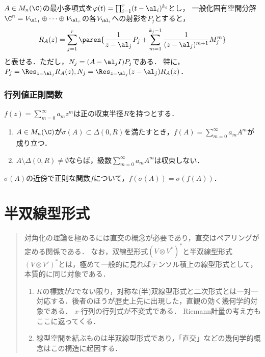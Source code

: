 \documentclass[uplatex, dvipdfmx]{jsreport}
\begin{document}
\begin{theorem}
    $A\in M_n(\C)$の最小多項式を$\varphi(t)=\prod_{i=1}^r(t-\al_i)^{k_i}$とし，
    一般化固有空間分解$\C^n=V_{\al_1}\oplus\cdots\oplus V_{\al_r}$の各$V_{\al_i}$への射影を$P_j$とすると，
    \[R_A(z)=\sum_{j=1}^r\paren{\frac{1}{z-\al_j}P_j+\sum_{m=1}^{k_j-1}\frac{1}{(z-\al_j)^{m+1}}M_j^m}\]
    と表せる．ただし，$N_j=(A-\al_j I)P_j$である．
    特に，$P_j=\Res_{z=\al_j}R_A(z),N_j=\Res_{z=\al_j}(z-\al_j)R_A(z)$．
\end{theorem}

\subsection{行列値正則関数}

\begin{theorem}
    $f(z)=\sum_{m=0}^\infty a_mz^m$は正の収束半径$R$を持つとする．
    \begin{enumerate}
        \item $A\in M_n(\C)$が$\sigma(A)\subset\Delta(0,R)$を満たすとき，$f(A)=\sum_{m=0}^\infty a_mA^m$が成り立つ．
        \item $A\setminus\Delta(0,R)\ne\emptyset$ならば，級数$\sum_{m=0}^\infty a_mA^m$は収束しない．
    \end{enumerate}
\end{theorem}

\begin{theorem}[スペクトル写像定理]
    $\sigma(A)$の近傍で正則な関数$f$について，$f(\sigma(A))=\sigma(f(A))$．
\end{theorem}

\chapter{半双線型形式}

\begin{quotation}
    対角化の理論を極めるには直交の概念が必要であり，直交はペアリングが定める関係である．
    なお，双線型形式$(V\otimes V^*)^*$と半双線型形式$(V\otimes V')^*$とは，極めて一般的に見ればテンソル積上の線型形式として，本質的に同じ対象である．
    \begin{enumerate}
        \item $K$の標数が2でない限り，対称な(半)双線型形式と二次形式とは一対一対応する．後者のほうが歴史上先に出現した，直観の効く幾何学的対象である．
        $x$-行列の行列式が不変式である．
        Riemann計量の考え方もここに返ってくる．
        \item 線型空間を結ぶものは半双線型形式であり，「直交」などの幾何学的概念はこの構造に起因する．
    \end{enumerate}
\end{quotation}
\end{document}
